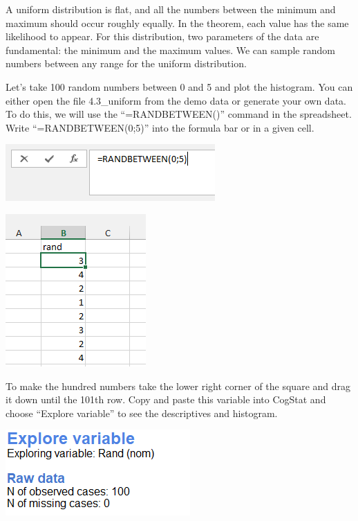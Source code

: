 \documentclass[
]{book}
\begin{document}
A uniform distribution is flat, and all the numbers between the minimum and maximum should occur roughly equally. In the theorem, each value has the same likelihood to appear. For this distribution, two parameters of the data are fundamental: the minimum and the maximum values. We can sample random numbers between any range for the uniform distribution.

Let's take 100 random numbers between 0 and 5 and plot the histogram. You can either open the file 4.3\_uniform from the demo data or generate your own data. To do this, we will use the ``=RANDBETWEEN()'' command in the spreadsheet. Write ``=RANDBETWEEN(0;5)'' into the formula bar or in a given cell.

\includegraphics{img/ch4/4.3randbetween_function.png}

\includegraphics{img/ch4/4.3randinexcel.png}

To make the hundred numbers take the lower right corner of the square and drag it down until the 101th row. Copy and paste this variable into CogStat and choose ``Explore variable'' to see the descriptives and histogram.

\includegraphics{img/ch4/4.3expvarraw.png}
\end{document}
